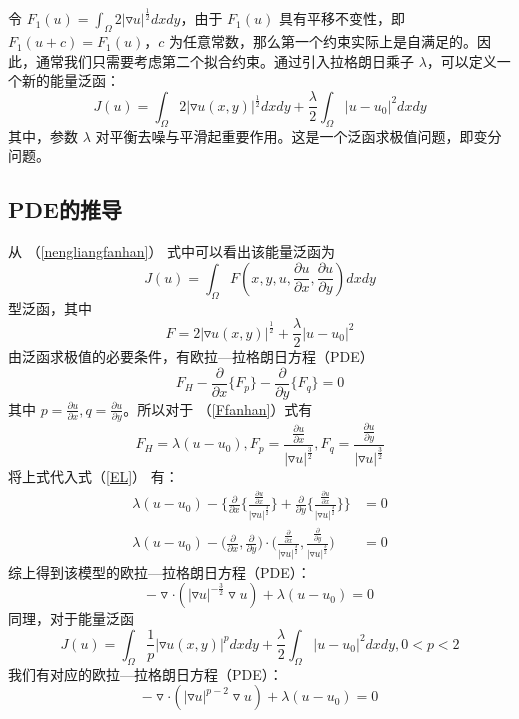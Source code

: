 令 $F_1(u)=\int_\Omega 2|\triangledown u|^{\frac{1}{2}}dxdy$，由于 $F_1(u)$ 具有平移不变性，即 $F_1(u+c)=F_1(u)$，$c$ 为任意常数，那么第一个约束实际上是自满足的。因此，通常我们只需要考虑第二个拟合约束。通过引入拉格朗日乘子 $\lambda$，可以定义一个新的能量泛函：
\begin{equation}
\label{nengliangfanhan}
J(u)=\int_\Omega 2|\triangledown u(x,y)|^{\frac{1}{2}} dxdy +\frac{\lambda}{2} \int_\Omega |u-u_0|^2dxdy
\end{equation}
其中，参数 $\lambda$ 对平衡去噪与平滑起重要作用。这是一个泛函求极值问题，即变分问题。

\subsection{PDE的推导}
从 （\ref{nengliangfanhan}） 式中可以看出该能量泛函为
\begin{equation}
J(u)=\int_\Omega F(x,y,u,\frac{\partial u}{\partial x},\frac{\partial u}{\partial y}) dxdy
\end{equation}
型泛函，其中
\begin{equation}
\label{Ffanhan}
F= 2|\triangledown u(x,y)|^{\frac{1}{2}}+\frac{\lambda}{2}|u-u_0|^2
\end{equation}
由泛函求极值的必要条件，有欧拉—拉格朗日方程（PDE）
\begin{equation}
\label{EL}
F_H-\frac{\partial}{\partial x}\{F_p\}-\frac{\partial}{\partial y}\{F_q\} =0
\end{equation}
其中 $p=\frac{\partial u}{\partial x},q=\frac{\partial u}{\partial y}$。所以对于 （\ref{Ffanhan}）式有
\begin{equation}
F_H=\lambda(u-u_0),F_p=\frac{\frac{\partial u}{\partial x}}{|\triangledown u|^{\frac{3}{2}}},F_q=\frac{\frac{\partial u}{\partial y}}{|\triangledown u|^{\frac{3}{2}}}
\end{equation}
将上式代入式（\ref{EL}） 有：
\begin{align*}
\lambda (u-u_0)-\Big\{\frac{\partial}{\partial x}\Big\{\frac{\frac{\partial u}{\partial x}}{|\triangledown u|^{\frac{3}{2}}}\Big\}+\frac{\partial}{\partial y}\Big\{\frac{\frac{\partial u}{\partial x}}{|\triangledown u|^{\frac{3}{2}}}\Big\}\Big\}&=0 \\
\lambda (u-u_0)-\Big(\frac{\partial}{\partial x},\frac{\partial}{\partial y}\Big)\cdot \Big(\frac{\frac{\partial}{\partial x}}{|\triangledown u|^\frac{3}{2}},\frac{\frac{\partial}{\partial y}}{|\triangledown u|^\frac{3}{2}}\Big)&=0
\end{align*}
综上得到该模型的欧拉—拉格朗日方程（PDE）：
\begin{equation}
\label{EL1}
-\triangledown \cdot (|\triangledown u|^{-\frac{3}{2}} \triangledown u)+\lambda (u-u_0)=0
\end{equation}
同理，对于能量泛函
\begin{equation}
J(u)=\int_\Omega \frac{1}{p}|\triangledown u(x,y)|^p dxdy +\frac{\lambda}{2} \int_\Omega |u-u_0|^2dxdy,0<p<2
\end{equation}
我们有对应的欧拉—拉格朗日方程（PDE）：
\begin{equation}
-\triangledown \cdot (|\triangledown u|^{p-2} \triangledown u)+\lambda (u-u_0)=0
\end{equation}

